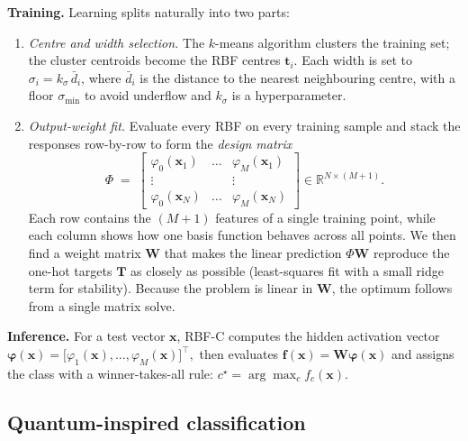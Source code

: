 \documentclass[twocolumn]{article} %
\begin{document}
\smallskip
\textbf{Training.}
Learning splits naturally into two parts:
\begin{enumerate}[leftmargin=1.5em,label=(\alph*)]
  \item \emph{Centre and width selection.}  
        The \(k\)-means algorithm clusters the training set; the cluster
        centroids become the RBF centres \(\mathbf t_i\).
        Each width is set to
        \(\sigma_i = k_\sigma\,\bar d_i\), where \(\bar d_i\) is the
        distance to the nearest neighbouring centre, with a floor
        \(\sigma_{\min}\) to avoid underflow and \(k_\sigma\) is a hyperparameter.
    \item \emph{Output-weight fit.}  
        Evaluate every RBF on every training sample and stack the
        responses row-by-row to form the \emph{design matrix}
        \[
          \Phi
          \;=\;
          \begin{bmatrix}
            \varphi_0(\mathbf x_1) & \dots & \varphi_M(\mathbf x_1)\\[-2pt]
            \vdots                 &       & \vdots\\[-2pt]
            \varphi_0(\mathbf x_N) & \dots & \varphi_M(\mathbf x_N)
          \end{bmatrix}
          \in\mathbb R^{N\times(M+1)}.
        \]
        Each row contains the \((M{+}1)\) features of a single training
        point, while each column shows how one basis function behaves
        across all points.  
        We then find a weight matrix \(\mathbf W\) that makes the linear
        prediction \(\Phi\mathbf W\) reproduce the one-hot targets
        \(\mathbf T\) as closely as possible (least-squares fit with a
        small ridge term for stability).  Because the problem is linear
        in \(\mathbf W\), the optimum follows from a single matrix solve.

\end{enumerate}

\smallskip
\textbf{Inference.}
For a test vector \(\mathbf x\), RBF-C computes the hidden activation
vector
\(
  \boldsymbol\varphi(\mathbf x)=
  \bigl[\varphi_1(\mathbf x),\dots,\varphi_M(\mathbf x)\bigr]^{\!\top},
\)
then evaluates
\(
  \mathbf f(\mathbf x)=\mathbf W\boldsymbol\varphi(\mathbf x)
\)
and assigns the class with a winner-takes-all rule:
\(c^\star=\arg\max_{c}f_c(\mathbf x)\).
\fi

\subsection{Quantum-inspired classification}
\label{subsec:qic}
\end{document}
